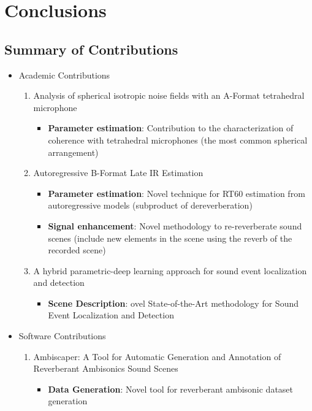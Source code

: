 \chapter{Conclusions}


\section{Summary of Contributions}


\begin{itemize}
  \item Academic Contributions
  
  \begin{enumerate}
  	\item Analysis of spherical isotropic noise fields with an A-Format tetrahedral microphone 
  	\begin{itemize}
  		\item \textbf{Parameter estimation}: Contribution to the characterization of coherence with tetrahedral microphones (the most common spherical arrangement)
	\end{itemize}


  	\item Autoregressive B-Format Late IR Estimation 
  	\begin{itemize}
  		\item \textbf{Parameter estimation}: Novel technique for RT60 estimation from autoregressive models (subproduct of dereverberation)
		\item \textbf{Signal enhancement}: Novel methodology to re-reverberate sound scenes (include new elements in the scene using the reverb of the recorded scene)
	\end{itemize}


  	\item A hybrid parametric-deep learning approach for sound event localization and detection 
  	\begin{itemize}
  		\item \textbf{Scene Description}: ovel State-of-the-Art methodology for Sound Event Localization and Detection	
  	\end{itemize}

  \end{enumerate}

  \item Software Contributions

	\begin{enumerate}
	
  		\item Ambiscaper: A Tool for Automatic Generation and Annotation of Reverberant Ambisonics Sound Scenes 
  		\begin{itemize}
  			\item \textbf{Data Generation}: Novel tool for reverberant ambisonic dataset generation
		\end{itemize}


\end{enumerate}
\end{itemize}
